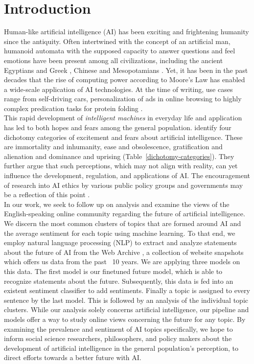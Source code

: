 \section{Introduction}

Human-like artificial intelligence (AI) has been exciting and frightening humanity since the antiquity.
Often intertwined with the concept of an artificial man, humanoid automata with the supposed capacity to answer questions and feel emotions have been present among all civilizations, including the ancient Egyptians and Greek \citep{Newquist1994}, Chinese \citep{cohen1986} and Mesopotamians \citep{unat2008}.
Yet, it has been in the past decades that the rise of computing power according to Moore’s Law has enabled a wide-scale application of AI technologies.
At the time of writing, use cases range from self-driving cars, personalization of ads in online browsing to highly complex predication tasks for protein folding \citep{jumper2021}.
\\
This rapid development of \emph{intelligent machines} in everyday life and application has led to both hopes and fears among the general population.
\citet{cave2019} identify four dichotomy categories of excitement and fears about artificial intelligence.
These are immortality and inhumanity, ease and obsolescence, gratification and alienation and dominance and uprising (Table~\ref{dichotomy-categories}).
They further argue that such perceptions, which may not align with reality, can yet influence the development, regulation, and applications of AI.
The encouragement of research into AI ethics by various public policy groups and governments may be a reflection of this point \citep{leslie2019}.
\\
In our work, we seek to follow up on \citet{cave2019} analysis and examine the views of the English-speaking online community regarding the future of artificial intelligence. We discern the most common clusters of topics that are formed around AI and the average sentiment for each topic using machine learning. To that end, we employ natural language processing (NLP) to extract and analyze statements about the future of AI from the Web Archive \citep{Deckers2022}, a collection of website snapshots which offers us data from the past ~10 years.
We are applying three models on this data.
The first model is our finetuned future model, which is able to recognize statements about the future.
Subsequently, this data is fed into an existent sentiment classifier  to add sentiments.
Finally a topic is assigned to every sentence by the last model.
This is followed by an analysis of the individual topic clusters.
While our analysis solely concerns artificial intelligence, our pipeline and models offer a way to study online views concerning the future for any topic. By examining the prevalence and sentiment of AI topics specifically, we hope to inform social science researchers, philosophers, and policy makers about the development of artificial intelligence in the general population’s perception, to direct efforts towards a better future with AI.  

